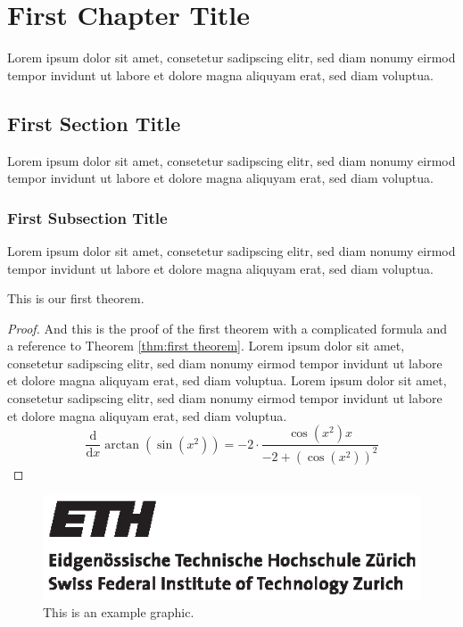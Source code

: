 \chapter{First Chapter Title}

Lorem ipsum dolor sit amet, consetetur sadipscing elitr, sed diam nonumy
eirmod tempor invidunt ut labore et dolore magna aliquyam erat, sed diam
voluptua.

\section{First Section Title}

Lorem ipsum dolor sit amet, consetetur sadipscing elitr, sed diam nonumy
eirmod tempor invidunt ut labore et dolore magna aliquyam erat, sed diam
voluptua.

\subsection{First Subsection Title}

Lorem ipsum dolor sit amet, consetetur sadipscing elitr, sed diam nonumy
eirmod tempor invidunt ut labore et dolore magna aliquyam erat, sed diam
voluptua.

\begin{theorem} \label{thm:first theorem} This is our first
theorem. \end{theorem}

\begin{proof} And this is the proof of the first theorem with a complicated
formula and a reference to Theorem \ref{thm:first theorem}. Lorem ipsum dolor
sit amet, consetetur sadipscing elitr, sed diam nonumy eirmod tempor invidunt
ut labore et dolore magna aliquyam erat, sed diam voluptua. Lorem ipsum dolor
sit amet, consetetur sadipscing elitr, sed diam nonumy eirmod tempor invidunt
ut labore et dolore magna aliquyam erat, sed diam voluptua. \begin{equation}
{\frac {\mathrm d}{\mathrm dx}}\arctan(\sin({x}^{2}))=-2 \cdot {\frac
{\cos({x}^{2})x}{-2+\left (\cos({x}^{2})\right )^{2}}} \end{equation}
\end{proof}

\begin{figure} \centering
\includegraphics[width=0.2\columnwidth]{figures/eth_logo_black.eps}
\caption{This is an example graphic.} \label{fig:example_figure} \end{figure}

